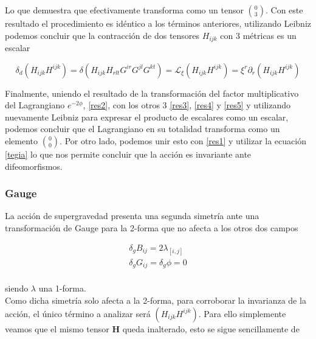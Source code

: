 \documentclass{article}
\numberwithin{equation}{section}
\begin{document}
Lo que demuestra que efectivamente transforma como un tensor $ \binom{0}{3} $. Con este resultado el procedimiento es idéntico a los términos anteriores, utilizando Leibniz podemos concluir que la contracción de dos tensores $ H_{i j k} $ con 3 métricas es un escalar\\

\begin{boxquation}
	\begin{equation}\label{res5}
	\delta_d  \left(H_{ijk}  H^{ijk}\right) = \delta \left(H_{ijk}  H_{rlt} G^{i r} G^{j l} G^{k t}\right) = \mathcal{L}_{\xi} \left( H_{ijk}  H^{ijk} \right) = \xi^r \partial_r \left( H_{ijk}  H^{ijk} \right)
	\end{equation}
\end{boxquation}

\vspace{0.4cm}

Finalmente, uniendo el resultado de la transformación del factor multiplicativo del Lagrangiano $ e^{-2\phi} $, \ref{res2},  con los otros 3 \ref{res3},  \ref{res4}  y  \ref{res5}  y utilizando nuevamente Leibniz para expresar el producto de escalares como un escalar, podemos concluir que el Lagrangiano en su totalidad transforma como un elemento $ \binom{0}{0} $. Por otro lado, podemos unir esto con \ref{res1} y utilizar la ecuación  \ref{tegia} lo que nos permite concluir que la acción es invariante ante difeomorfismos.\\

	
\subsubsection{Gauge}

La acción de supergravedad presenta una segunda simetría ante una transformación de Gauge para la 2-forma que no afecta a los otros dos campos
	
\begin{equation}\label{gauge}
\begin{aligned}
\delta_g B_{i j} = 2 \lambda_{\left[i , j\right]}
\\
\delta_g G_{i j} = \delta_g \phi = 0\\
\end{aligned}
\end{equation}
	
siendo $ \lambda $ una 1-forma.\\


Como dicha simetría solo afecta a la 2-forma, para corroborar la invarianza de la acción, el único término a analizar será $ \left(H_{i j k}  H^{i j k}\right)  $. Para ello simplemente veamos que el mismo tensor $\textbf{H} $ queda inalterado, esto se sigue sencillamente de
\end{document}
